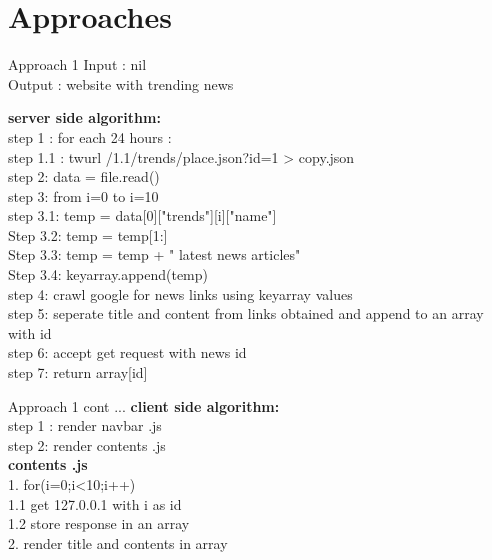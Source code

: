 \documentclass{beamer}
\begin{document}
	\section{Approaches}
	\begin{frame}{Approach 1}
		\footnotesize
	Input : nil \\
	Output :  website with trending news
	
	\footnotesize
	\textbf{server side algorithm: }\\
	step 1 :  for each 24 hours : \\
	\hspace{.2cm} step 1.1 : twurl /1.1/trends/place.json?id=1 > copy.json\\
	step 2:  data = file.read() \\
	step 3:  from i=0 to i=10 \\
	\hspace{.2cm}step 3.1: temp = data[0]["trends"][i]["name"]\\   
	\hspace{.2cm}Step 3.2:  temp = temp[1:]  \\
\hspace{.2cm}Step 3.3:  temp = temp + " latest news articles"\\
\hspace{.2cm}Step 3.4:  keyarray.append(temp)  \\
step 4: crawl google for news links using keyarray values\\
step 5: seperate title and content from links obtained  and append to an array with id \\
step 6: accept get request with news id\\
step 7: return array[id]
		
	\end{frame}
	\begin{frame}{Approach 1 cont ...}	
	\footnotesize
	\textbf{client side algorithm: }\\
	step 1 : render  navbar .js  \\	
	step 2:  render  contents .js \\
	\vspace{5mm}
	\textbf{contents .js}\\
	\vspace{5mm}
	1. for(i=0;i<10;i++)\\
	\hspace{.2cm}1.1 get 127.0.0.1 with i as id\\
	\hspace{.2cm}1.2 store response in an array\\
	2. render title and contents in array
	
  
\end{frame}
\end{document}
